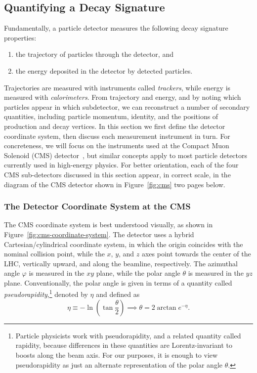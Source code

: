 \documentclass[11pt, a4paper]{article}
\begin{document}
\subsection{Quantifying a Decay Signature} \label{ss:quantify-decay}
Fundamentally, a particle detector measures the following decay signature properties:
\begin{enumerate}

    \item the trajectory of particles through the detector, and

    \item the energy deposited in the detector by detected particles.

\end{enumerate}
Trajectories are measured with instruments called \textit{trackers}, while energy is measured with \textit{calorimeters}.
From trajectory and energy, and by noting which particles appear in which subdetector, we can reconstruct a number of secondary quantities, including particle momentum, identity, and the positions of production and decay vertices.
In this section we first define the detector coordinate system, then discuss each measurement instrument in turn.
For concreteness, we will focus on the instruments used at the Compact Muon Solenoid (CMS) detector~\cite{cms}, but similar concepts apply to most particle detectors currently used in high-energy physics.
For better orientation, each of the four CMS sub-detectors discussed in this section appear, in correct scale, in the diagram of the CMS detector shown in Figure~\ref{fig:cms} two pages below.

\subsubsection{The Detector Coordinate System at the CMS}
The CMS coordinate system is best understood visually, as shown in Figure~\ref{fig:cms-coordinate-system}.
The detector uses a hybrid Cartesian/cylindrical coordinate system, in which the origin coincides with the nominal collision point, while the $ x $, $ y $, and $ z $ axes point towards the center of the LHC, vertically upward, and along the beamline, respectively.
The azimuthal angle $ \varphi $ is measured in the $ xy $ plane, while the polar angle $ \theta $ is measured in the $ yz $ plane.
Conventionally, the polar angle is given in terms of a quantity called \textit{pseudorapidity},\footnote{Particle physicists work with pseudorapidity, and a related quantity called rapidity, because differences in these quantities are Lorentz-invariant to boosts along the beam axis.
For our purposes, it is enough to view pseudorapidity as just an alternate representation of the polar angle $ \theta $.} denoted by $ \eta $ and defined as
\begin{equation}
    \eta \equiv - \ln \left( \tan \frac{\theta}{2} \right) \implies \theta = 2 \arctan e^{- \eta}. \label{eq:pseudorapidity}
\end{equation}
\end{document}
